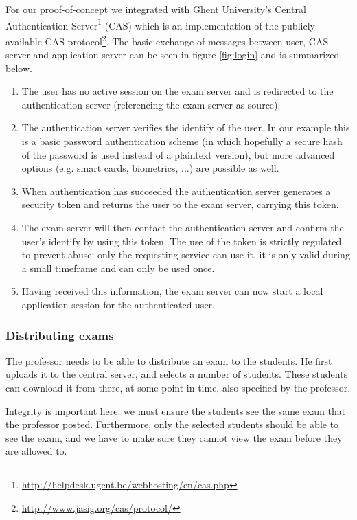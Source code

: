 \documentclass{article}
\begin{document}
For our proof-of-concept we integrated with Ghent University's Central
Authentication Server\footnote{\url{http://helpdesk.ugent.be/webhosting/en/cas.php}}
(CAS) which is an implementation of the publicly available CAS
protocol\footnote{\url{http://www.jasig.org/cas/protocol/}}. The basic
exchange of messages between user, CAS server and application server can be seen
in figure \ref{fig:login} and is summarized below.

\begin{enumerate}
\item The user has no active session on the exam server and is redirected
  to the authentication server (referencing the exam server as source).
\item The authentication server verifies the identify of the user. In our
  example this is a basic password authentication scheme (in which hopefully a
  secure hash of the password is used instead of a plaintext version), but more
  advanced options (e.g. smart cards, biometrics, ...) are possible as well.
\item When authentication has succeeded the authentication server generates
  a security token and returns the user to the exam server, carrying this token.
\item The exam server will then contact the authentication server and confirm
  the user's identify by using this token. The use of the token is strictly
  regulated to prevent abuse: only the requesting service can use it, it is only
  valid during a small timeframe and can only be used once.
\item Having received this information, the exam server can now start a local
  application session for the authenticated user.
\end{enumerate}

\subsubsection{Distributing exams}

The professor needs to be able to distribute an exam to the students. He first
uploads it to the central server, and selects a number of students. These
students can download it from there, at some point in time, also specified by
the professor.

Integrity is important here: we must ensure the students see the same exam that
the professor posted. Furthermore, only the selected students should be able to
see the exam, and we have to make sure they cannot view the exam before they are
allowed to.
\end{document}
